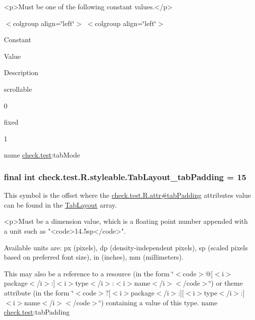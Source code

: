 \begin{DoxyVerb}      <p>Must be one of the following constant values.</p>
\end{DoxyVerb}
 \begin{TabularC}{0}
\hline
\end{TabularC}
$<$colgroup align=\char`\"{}left\char`\"{}$>$ $<$colgroup align=\char`\"{}left\char`\"{}$>$ 

Constant

Value

Description 

{\ttfamily scrollable}

0

{\ttfamily fixed}

1

name \hyperlink{namespacecheck_1_1test}{check.\+test}\+:tab\+Mode \hypertarget{classcheck_1_1test_1_1_r_1_1styleable_a6426fde2392c9bb8c68b9824ba4a31d5}{}
\subsubsection[{Tab\+Layout\+\_\+tab\+Padding}]{\setlength{\rightskip}{0pt plus 5cm}final int check.\+test.\+R.\+styleable.\+Tab\+Layout\+\_\+tab\+Padding = 15\hspace{0.3cm}{\ttfamily [static]}}\label{classcheck_1_1test_1_1_r_1_1styleable_a6426fde2392c9bb8c68b9824ba4a31d5}
This symbol is the offset where the \hyperlink{classcheck_1_1test_1_1_r_1_1attr_a7a7f8dc9a8192875a3695243aa9e8285}{check.\+test.\+R.\+attr\#tab\+Padding} attribute\textquotesingle{}s value can be found in the \hyperlink{classcheck_1_1test_1_1_r_1_1styleable_a2a3232e8d38a43f5131a16385abbbed8}{Tab\+Layout} array.

\begin{DoxyVerb}      <p>Must be a dimension value, which is a floating point number appended with a unit such as "<code>14.5sp</code>".
\end{DoxyVerb}
 Available units are\+: px (pixels), dp (density-\/independent pixels), sp (scaled pixels based on preferred font size), in (inches), mm (millimeters). 

This may also be a reference to a resource (in the form \char`\"{}$<$code$>$@\mbox{[}$<$i$>$package$<$/i$>$\+:\mbox{]}$<$i$>$type$<$/i$>$\+:$<$i$>$name$<$/i$>$$<$/code$>$\char`\"{}) or theme attribute (in the form \char`\"{}$<$code$>$?\mbox{[}$<$i$>$package$<$/i$>$\+:\mbox{]}\mbox{[}$<$i$>$type$<$/i$>$\+:\mbox{]}$<$i$>$name$<$/i$>$$<$/code$>$\char`\"{}) containing a value of this type.  name \hyperlink{namespacecheck_1_1test}{check.\+test}\+:tab\+Padding \hypertarget{classcheck_1_1test_1_1_r_1_1styleable_aca2df98e251a1a4ec4ae92a5fbd6d93d}{}
